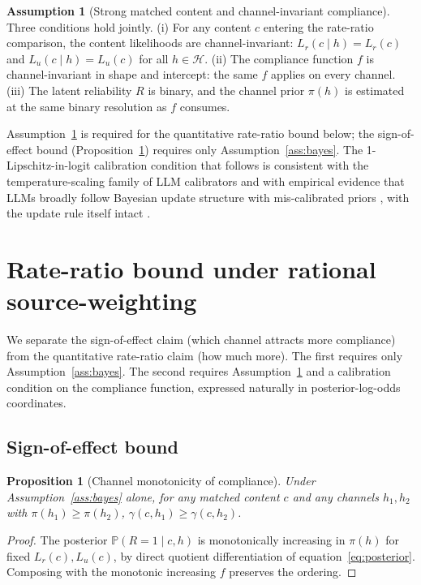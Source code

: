 \documentclass[11pt]{article}
\newtheorem{proposition}{Proposition}
\theoremstyle{definition}
\newtheorem{assumption}{Assumption}
\theoremstyle{remark}
\begin{document}
\begin{assumption}[Strong matched content and channel-invariant compliance]
\label{ass:strong-matching}
Three conditions hold jointly. (i) For any content $c$ entering the rate-ratio
comparison, the content likelihoods are channel-invariant:
$L_r(c \mid h) = L_r(c)$ and $L_u(c \mid h) = L_u(c)$ for all $h \in \mathcal{H}$.
(ii) The compliance function $f$ is channel-invariant in shape and intercept:
the same $f$ applies on every channel. (iii) The latent reliability $R$ is binary,
and the channel prior $\pi(h)$ is estimated at the same binary resolution as $f$
consumes.
\end{assumption}

Assumption~\ref{ass:strong-matching} is required for the quantitative rate-ratio
bound below; the sign-of-effect bound (Proposition~\ref{prop:sign}) requires only
Assumption~\ref{ass:bayes}. The 1-Lipschitz-in-logit calibration condition that
follows is consistent with the temperature-scaling family of LLM calibrators
\cite{lamb2025semantic} and with empirical evidence that LLMs broadly follow
Bayesian update structure with mis-calibrated priors , with the update rule itself intact
\cite{gupta2025coinflips}.

\section{Rate-ratio bound under rational source-weighting}
\label{sec:rate-ratio}

We separate the sign-of-effect claim (which channel attracts more compliance) from
the quantitative rate-ratio claim (how much more). The first requires only
Assumption~\ref{ass:bayes}. The second requires Assumption~\ref{ass:strong-matching}
and a calibration condition on the compliance function, expressed naturally in
posterior-log-odds coordinates.

\subsection{Sign-of-effect bound}

\begin{proposition}[Channel monotonicity of compliance]
\label{prop:sign}
Under Assumption~\ref{ass:bayes} alone, for any matched content $c$ and any channels
$h_1, h_2$ with $\pi(h_1) \ge \pi(h_2)$,
$\gamma(c, h_1) \ge \gamma(c, h_2)$.
\end{proposition}

\begin{proof}
The posterior $\mathbb{P}(R=1 \mid c, h)$ is monotonically increasing in $\pi(h)$
for fixed $L_r(c), L_u(c)$, by direct quotient differentiation of
equation~\eqref{eq:posterior}. Composing with the monotonic increasing $f$ preserves
the ordering.
\end{proof}
\end{document}
